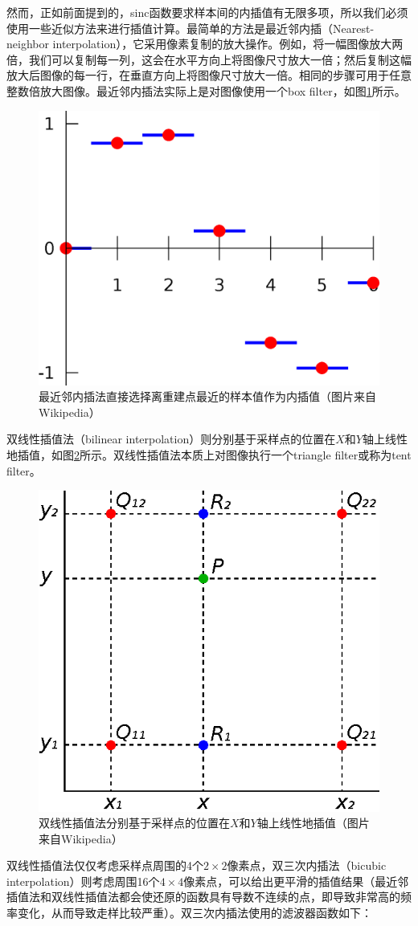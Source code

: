 然而，正如前面提到的，sinc函数要求样本间的内插值有无限多项，所以我们必须使用一些近似方法来进行插值计算。最简单的方法是最近邻内插（Nearest-neighbor interpolation），它采用像素复制的放大操作。例如，将一幅图像放大两倍，我们可以复制每一列，这会在水平方向上将图像尺寸放大一倍；然后复制这幅放大后图像的每一行，在垂直方向上将图像尺寸放大一倍。相同的步骤可用于任意整数倍放大图像。最近邻内插法实际上是对图像使用一个box filter，如图\ref{f:intro-Piecewise_constant}所示。

\begin{figure}
\sidecaption
	\includegraphics[width=.4\textwidth]{figures/intro/Piecewise_constant}
	\caption{最近邻内插法直接选择离重建点最近的样本值作为内插值（图片来自Wikipedia）}
	\label{f:intro-Piecewise_constant}
\end{figure}

双线性插值法（bilinear interpolation）则分别基于采样点的位置在$X$和$Y$轴上线性地插值，如图\ref{f:intro-BilinearInterpolation}所示。双线性插值法本质上对图像执行一个triangle filter或称为tent filter。

\begin{figure}
\sidecaption
	\includegraphics[width=.4\textwidth]{figures/intro/BilinearInterpolation}
	\caption{双线性插值法分别基于采样点的位置在$X$和$Y$轴上线性地插值（图片来自Wikipedia）}
	\label{f:intro-BilinearInterpolation}
\end{figure}


双线性插值法仅仅考虑采样点周围的4个$2\times 2$像素点，双三次内插法（bicubic interpolation）则考虑周围16个$4\times 4$像素点，可以给出更平滑的插值结果（最近邻插值法和双线性插值法都会使还原的函数具有导数不连续的点，即导致非常高的频率变化，从而导致走样比较严重）。双三次内插法使用的滤波器函数如下：

